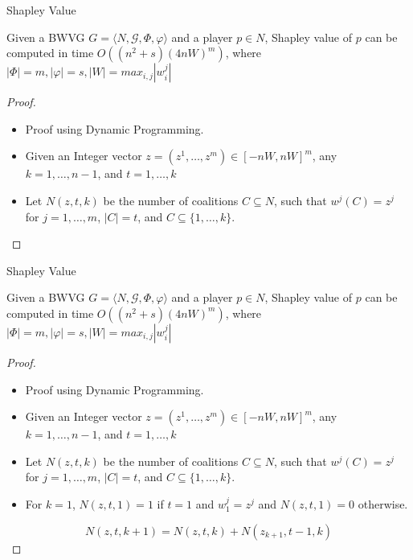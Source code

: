 \documentclass{beamer}
\begin{document}
\begin{frame}[fragile]{Shapley Value}
  \begin{theorem6}
    Given a BWVG $G = \langle N, \mathcal{G}, \Phi, \varphi \rangle$ and a player $p \in N$, Shapley value of $p$ can be computed in time $O((n^2 + s)(4nW)^m)$, where $|\Phi| = m, |\varphi| = s, |W| = max_{i,j}|w_i^j|$
  \end{theorem6}
  \begin{proof}
    \begin{itemize}
      \item Proof using Dynamic Programming.
      \item Given an Integer vector $z = (z^1,\dots,z^m) \in [-nW, nW]^m$, any $k=1,\dots,n-1$, and $t = 1,\dots,k$
      \item Let $N(z,t,k)$ be the number of coalitions $C \subseteq N$, such that $w^j(C) = z^j$ for $j=1,\dots,m$, $|C|=t$, and $C \subseteq \{1,\dots,k\}$.
    \end{itemize}
  \end{proof}
\end{frame}


\begin{frame}[fragile]{Shapley Value}
  \begin{theorem6}
    Given a BWVG $G = \langle N, \mathcal{G}, \Phi, \varphi \rangle$ and a player $p \in N$, Shapley value of $p$ can be computed in time $O((n^2 + s)(4nW)^m)$, where $|\Phi| = m, |\varphi| = s, |W| = max_{i,j}|w_i^j|$
  \end{theorem6}
  \begin{proof}
    \begin{itemize}
      \item Proof using Dynamic Programming.
      \item Given an Integer vector $z = (z^1,\dots,z^m) \in [-nW, nW]^m$, any $k=1,\dots,n-1$, and $t = 1,\dots,k$
      \item Let $N(z,t,k)$ be the number of coalitions $C \subseteq N$, such that $w^j(C) = z^j$ for $j=1,\dots,m$, $|C|=t$, and $C \subseteq \{1,\dots,k\}$.
      \item For $k=1$, $N(z,t,1) = 1$ if $t=1$ and $w_1^j=z^j$ and $N(z,t,1) =  0$ otherwise.
    \end{itemize}
    \begin{equation}
      N(z,t,k+1) = N(z,t,k) + N(z_{k+1},t-1,k)
    \end{equation}
  \end{proof}
\end{frame}
\end{document}
